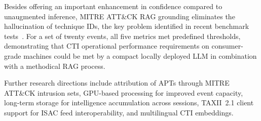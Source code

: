 \documentclass[conference]{IEEEtran}
\begin{document}
Besides offering an important enhancement in confidence compared to unaugmented inference, MITRE ATT&CK RAG grounding eliminates the hallucination of technique IDs, the key problem identified in recent benchmark tests~\cite{alam2026athena,cheng2025ctiarena}.
For a set of twenty events, all five metrics met predefined thresholds, demonstrating that CTI operational performance requirements on consumer-grade machines could be met by a compact locally deployed LLM in combination with a methodical RAG process.

Further research directions include attribution of APTs through MITRE ATT&CK intrusion sets, GPU-based processing for improved event capacity, long-term storage for intelligence accumulation across sessions, TAXII~2.1 client support for ISAC feed interoperability, and multilingual CTI embeddings.
\end{document}
